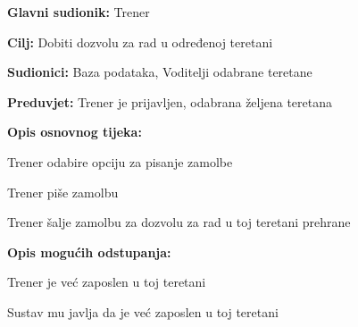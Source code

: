 				\noindent {}
					\begin{packed_item}
	
						\item \textbf{Glavni sudionik: } Trener
						\item  \textbf{Cilj:} Dobiti dozvolu za rad u određenoj teretani
						\item  \textbf{Sudionici:} Baza podataka, Voditelji odabrane teretane
						\item  \textbf{Preduvjet:} Trener je prijavljen, odabrana željena teretana
						\item  \textbf{Opis osnovnog tijeka:}
						
						\item[] \begin{packed_enum}
						
	                        \item Trener odabire opciju za pisanje zamolbe
							\item Trener piše zamolbu
							\item Trener šalje zamolbu za dozvolu za rad u toj teretani prehrane
						\end{packed_enum}
						
						\item  \textbf{Opis mogućih odstupanja:}
						
						\item[] \begin{packed_item}
	
							\item[-] Trener je već zaposlen u toj teretani
							\item[] \begin{packed_enum}
								
								\item Sustav mu javlja da je već zaposlen u toj teretani
								
							\end{packed_enum}
							
						\end{packed_item}
					\end{packed_item}
				

